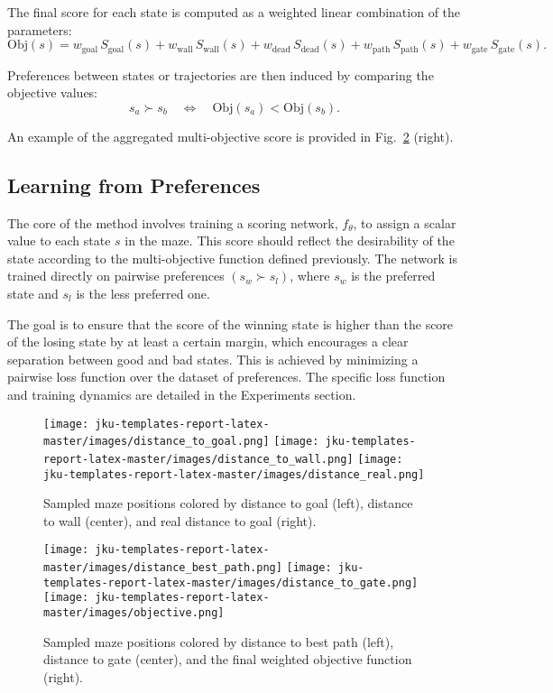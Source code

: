 \documentclass[a4paper,oneside,10pt,ngerman,english]{scrartcl}
\begin{document}
The final score for each state is computed as a weighted linear combination of the parameters:
\[
\text{Obj}(s) = w_{\text{goal}} \, S_{\text{goal}}(s) 
+ w_{\text{wall}} \, S_{\text{wall}}(s) 
+ w_{\text{dead}} \, S_{\text{dead}}(s) 
+ w_{\text{path}} \, S_{\text{path}}(s) 
+ w_{\text{gate}} \, S_{\text{gate}}(s).
\]

Preferences between states or trajectories are then induced by comparing the objective values:
\[
s_a \succ s_b \quad \Leftrightarrow \quad \text{Obj}(s_a) < \text{Obj}(s_b).
\]

An example of the aggregated multi-objective score is provided in Fig.~\ref{fig:maze_params2} (right).

\subsection{Learning from Preferences}

The core of the method involves training a scoring network, $f_\theta$, to assign a scalar value to each state $s$ in the maze. This score should reflect the desirability of the state according to the multi-objective function defined previously. The network is trained directly on pairwise preferences $(s_w \succ s_l)$, where $s_w$ is the preferred state and $s_l$ is the less preferred one.

The goal is to ensure that the score of the winning state is higher than the score of the losing state by at least a certain margin, which encourages a clear separation between good and bad states. This is achieved by minimizing a pairwise loss function over the dataset of preferences. The specific loss function and training dynamics are detailed in the Experiments section.

\begin{figure}[h!]
  \centering
  \texttt{[image: jku-templates-report-latex-master/images/distance\_to\_goal.png]}
  \texttt{[image: jku-templates-report-latex-master/images/distance\_to\_wall.png]}
  \texttt{[image: jku-templates-report-latex-master/images/distance\_real.png]}
  \caption{Sampled maze positions colored by distance to goal (left), distance to wall (center), and real distance to goal (right).}
  \label{fig:maze_params1}
\end{figure}

\begin{figure}[h!]
  \centering
  \texttt{[image: jku-templates-report-latex-master/images/distance\_best\_path.png]}
  \texttt{[image: jku-templates-report-latex-master/images/distance\_to\_gate.png]}
  \texttt{[image: jku-templates-report-latex-master/images/objective.png]}
  \caption{Sampled maze positions colored by distance to best path (left), distance to gate (center), and the final weighted objective function (right).}
  \label{fig:maze_params2}
\end{figure}
\end{document}
